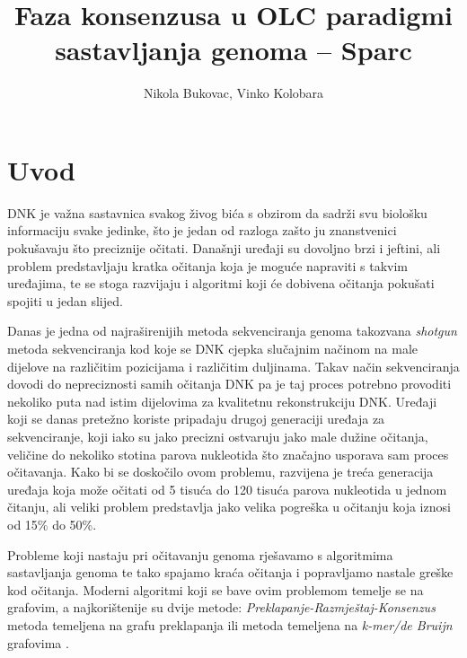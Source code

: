 \documentclass[times, utf8, seminar, numeric]{fer}
\begin{document}
\title{Faza konsenzusa u OLC paradigmi sastavljanja genoma – Sparc}

\author{Nikola Bukovac, Vinko Kolobara}


\maketitle

\tableofcontents

\chapter{Uvod}
DNK je važna sastavnica svakog živog bića s obzirom da sadrži svu biološku informaciju svake jedinke, što je jedan od razloga zašto ju znanstvenici pokušavaju što preciznije očitati. Današnji uređaji su dovoljno brzi i jeftini, ali problem predstavljaju kratka očitanja koja je moguće napraviti s takvim uređajima, te se stoga razvijaju i algoritmi koji će dobivena očitanja pokušati spojiti u jedan slijed.

Danas je jedna od najraširenijih metoda sekvenciranja genoma takozvana \emph{shotgun} \cite[Poglavlje~1.2.2]{sikic2013bioinformatika} metoda sekvenciranja kod koje se DNK cjepka slučajnim načinom na male dijelove na različitim pozicijama i različitim duljinama. Takav način sekvenciranja dovodi do nepreciznosti samih očitanja DNK pa je taj proces potrebno provoditi nekoliko puta nad istim dijelovima za kvalitetnu rekonstrukciju DNK. Uređaji koji se danas pretežno koriste pripadaju drugoj generaciji uređaja za sekvenciranje, koji iako su jako precizni ostvaruju jako male dužine očitanja, veličine do nekoliko stotina parova nukleotida što značajno usporava sam proces očitavanja. Kako bi se doskočilo ovom problemu, razvijena je treća generacija uređaja koja može očitati od 5 tisuća do 120 tisuća parova nukleotida u jednom čitanju, ali veliki problem predstavlja jako velika pogreška u očitanju koja iznosi od 15\% do 50\%.

Probleme koji nastaju pri očitavanju genoma rješavamo s algoritmima sastavljanja genoma te tako spajamo kraća očitanja i popravljamo nastale greške kod očitanja. Moderni algoritmi koji se bave ovim problemom temelje se na grafovim, a najkorištenije su dvije metode: \emph{Preklapanje-Razmještaj-Konsenzus} metoda temeljena na grafu preklapanja ili metoda temeljena na \emph{k-mer/de Bruijn} grafovima \cite{sikic2013bioinformatika}.
\end{document}
